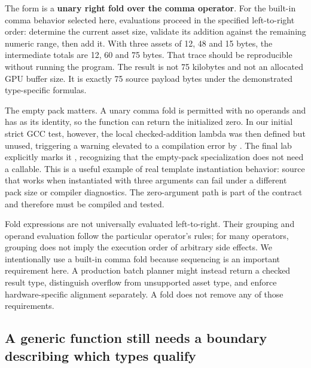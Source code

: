 The  form is a \textbf{unary right fold over the comma operator}. For the built-in comma behavior selected here, evaluations proceed in the specified left-to-right order: determine the current asset size, validate its addition against the remaining numeric range, then add it. With three assets of 12, 48 and 15 bytes, the intermediate totals are 12, 60 and 75 bytes. That trace should be reproducible without running the program. The result is not 75 kilobytes and not an allocated GPU buffer size. It is exactly 75 source payload bytes under the demonstrated type-specific formulas.

The empty pack matters. A unary comma fold is permitted with no operands and has  as its identity, so the function can return the initialized zero. In our initial strict GCC test, however, the local checked-addition lambda was then defined but unused, triggering a warning elevated to a compilation error by . The final lab explicitly marks it , recognizing that the empty-pack specialization does not need a callable. This is a useful example of real template instantiation behavior: source that works when instantiated with three arguments can fail under a different pack size or compiler diagnostics. The zero-argument path is part of the contract and therefore must be compiled and tested.

Fold expressions are not universally evaluated left-to-right. Their grouping and operand evaluation follow the particular operator's rules; for many operators, grouping does not imply the execution order of arbitrary side effects. We intentionally use a built-in comma fold because sequencing is an important requirement here. A production batch planner might instead return a checked result type, distinguish overflow from unsupported asset type, and enforce hardware-specific alignment separately. A fold does not remove any of those requirements.

\subsection{A generic function still needs a boundary describing which types qualify}\label{05-engine-i-ch005-a-generic-function-still-needs-a-boundary-describing-which-types-qualify}

